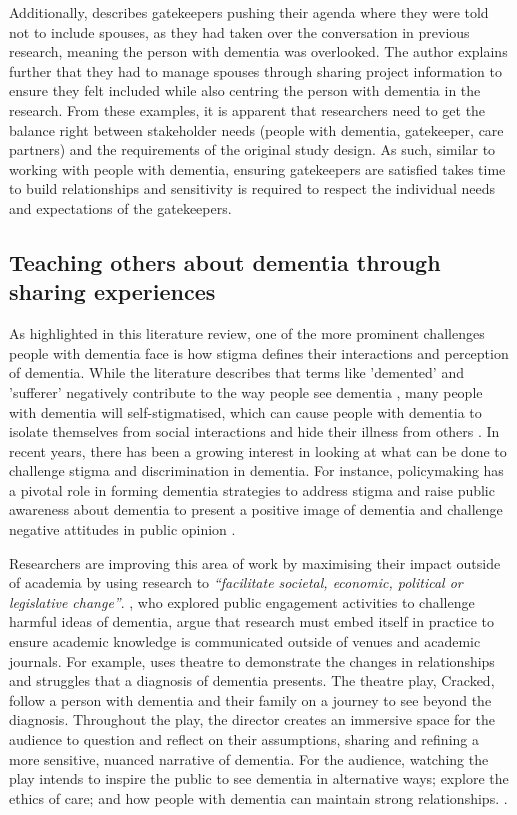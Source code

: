 Additionally, \cite{thoft2021journey} describes gatekeepers pushing their agenda where they were told not to include spouses, as they had taken over the conversation in previous research, meaning the person with dementia was overlooked. The author explains further that they had to manage spouses through sharing project information to ensure they felt included while also centring the person with dementia in the research. From these examples, it is apparent that researchers need to get the balance right between stakeholder needs (people with dementia, gatekeeper, care partners) and the requirements of the original study design. As such, similar to working with people with dementia, ensuring gatekeepers are satisfied takes time to build relationships and sensitivity is required to respect the individual needs and expectations of the gatekeepers.

\subsection{Teaching others about dementia through sharing experiences}
\label{BL:PublicPerception}
As highlighted in this literature review, one of the more prominent challenges people with dementia face is how stigma defines their interactions and perception of dementia. While the literature describes that terms like 'demented' and 'sufferer' negatively contribute to the way people see dementia \citep{peel2014living}, many people with dementia will self-stigmatised, which can cause people with dementia to isolate themselves from social interactions and hide their illness from others \citep{milne2010d}. In recent years, there has been a growing interest in looking at what can be done to challenge stigma and discrimination in dementia. For instance, policymaking has a pivotal role in forming dementia strategies to address stigma and raise public awareness about dementia to present a positive image of dementia and challenge negative attitudes in public opinion \citep{kontos_raising_2018,herrmann_systematic_2018}. 

Researchers are improving this area of work by maximising their impact outside of academia by using research to \textit{``facilitate societal, economic, political or legislative change''}. \cite{tischler2020using}, who explored public engagement activities to challenge harmful ideas of dementia, argue that research must embed itself in practice to ensure academic knowledge is communicated outside of venues and academic journals. For example, \cite{kontos_raising_2018} uses theatre to demonstrate the changes in relationships and struggles that a diagnosis of dementia presents. The theatre play, Cracked, follow a person with dementia and their family on a journey to see beyond the diagnosis. Throughout the play, the director creates an immersive space for the audience to question and reflect on their assumptions, sharing and refining a more sensitive, nuanced narrative of dementia. For the audience, watching the play intends to inspire the public to see dementia in alternative ways; explore the ethics of care; and how people with dementia can maintain strong relationships.  \citep{gray2020knowledge}.

